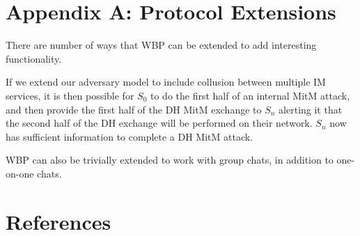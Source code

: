 \documentclass[twoside]{article}
\begin{document}
\begin{multicols}{2}
\section{Appendix A: Protocol Extensions}
There are number of ways that WBP can be extended to add interesting functionality.  

If we extend our adversary model to include collusion between multiple IM services, it is then possible for $S_0$ to do the first half of an internal MitM attack, and then provide the first half of the DH MitM exchange to $S_n$ alerting it that the second half of the DH exchange will be performed on their network.  $S_n$ now has sufficient information to complete a DH MitM attack.


WBP can also be trivially extended to work with group chats, in addition to one-on-one chats.

\section{References}




\end{multicols}
\end{document}
